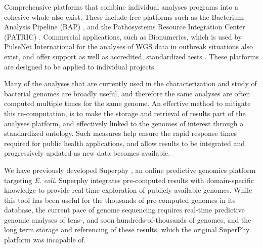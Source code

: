 \documentclass{article}
\begin{document}
Comprehensive platforms that combine individual analyses programs into a cohesive whole also exist. These include free platforms such as the Bacterium Analysis Pipeline (BAP) \cite{thomsen2016bacterial}, and the Pathosystems Resource Integration Center (PATRIC) \cite{wattam2016improvements}. Commercial applications, such as Bionumerics, which is used by PulseNet International for the analyses of WGS data in outbreak situations also exist, and offer support as well as accredited, standardized tests \cite{swaminathan2001pulsenet}. These platforms are designed to be applied to individual projects.

Many of the analyses that are currently used in the characterization and study of bacterial genomes are broadly useful, and therefore the same analyses are often computed multiple times for the same genome. An effective method to mitigate this re-computation, is to make the storage and retrieval of results part of the analyses platform, and effectively linked to the genomes of interest through a standardized ontology. Such measures help ensure the rapid response times required for public health applications, and allow results to be integrated and progressively updated as new data becomes available.

We have previously developed Superphy \cite{whiteside2016superphy}, an online predictive genomics platform targeting \textit{E. coli}. Superphy integrates pre-computed results with domain-specific knowledge to provide real-time exploration of publicly available genomes. While this tool has been useful for the thousands of pre-computed genomes in its database, the current pace of genome sequencing requires real-time predictive genomic analyses of tens-, and soon hundreds-of-thousands of genomes, and the long term storage and referencing of these results, which the original SuperPhy platform was incapable of.

\end{document}
